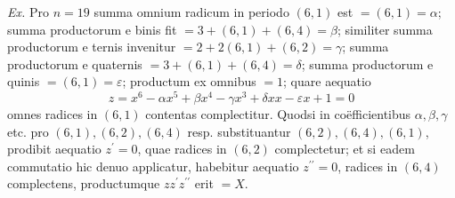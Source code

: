 \textit{Ex.} Pro \(n=19\) summa omnium radicum in periodo \((6,1)\) est \(=(6,1)=\alpha\); summa productorum e binis fit \(=3+(6,1)+(6,4)=\beta\); similiter
summa productorum e ternis invenitur \(=2+2(6,1)+(6,2)=\gamma\); summa productorum e quaternis \(=3+(6,1)+(6,4)=\delta\); summa productorum e quinis \(=(6,1)=\varepsilon\); productum ex omnibus \(=1\); quare aequatio \[z=x^6-\alpha x^5+\beta x^4-\gamma x^3+\delta xx-\varepsilon x+1=0\] omnes radices in \((6,1)\) contentas complectitur. Quodsi in coëfficientibus \(\alpha,\allowbreak \beta,\allowbreak \gamma\) etc. pro \((6,1),\allowbreak (6,2),\allowbreak (6,4)\) resp. substituantur \((6,2),\allowbreak (6,4),\allowbreak (6,1)\), prodibit aequatio \(z^{\prime}=0\), quae radices in \((6,2)\) complectetur; et si eadem commutatio hic denuo applicatur, habebitur aequatio \(z^{\prime\prime}=0\), radices in \((6,4)\) complectens, productumque \(zz^{\prime}z^{\prime\prime}\) erit \(=X\).

